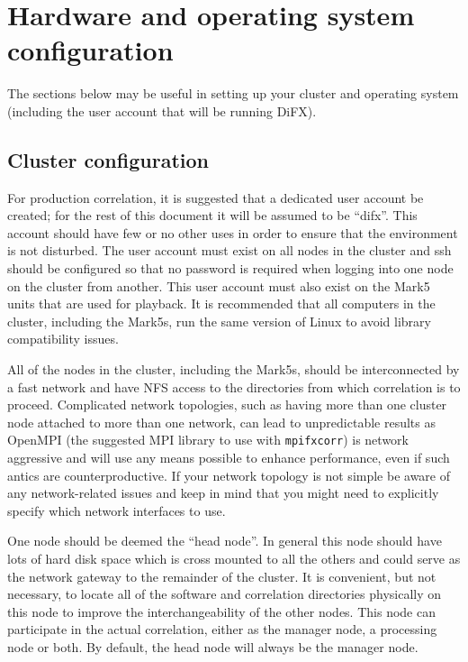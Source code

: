 
\section{Hardware and operating system configuration}

The sections below may be useful in setting up your cluster and operating system (including the user account that will be running DiFX).

\subsection{Cluster configuration} \label{sec:cluster}

For production correlation, it is suggested that a dedicated user account be created; for the rest of this document it will be assumed to be ``difx''.
This account should have few or no other uses in order to ensure that the environment is not disturbed.
The user account must exist on all nodes in the cluster and ssh should be configured so that no password is required when logging into one node on the cluster from another.
This user account must also exist on the Mark5 units that are used for playback.
It is recommended that all computers in the cluster, including the Mark5s, run the same version of Linux to avoid library compatibility issues.

All of the nodes in the cluster, including the Mark5s, should be interconnected by a fast network and have NFS access to the directories from which correlation is to proceed.
Complicated network topologies, such as having more than one cluster node attached to more than one network, can lead to unpredictable results as OpenMPI (the suggested MPI library to use with {\tt mpifxcorr}) is network aggressive and will use any means possible to enhance performance, even if such antics are counterproductive.
If your network topology is not simple be aware of any network-related issues and keep in mind that you might need to explicitly specify which network interfaces to use.

One node should be deemed the ``head node''.
In general this node should have lots of hard disk space which is cross mounted to all the others and could serve as the network gateway to the remainder of the cluster.
It is convenient, but not necessary, to locate all of the software and correlation directories physically on this node to improve the interchangeability of the other nodes.
This node can participate in the actual correlation, either as the manager node, a processing node or both.
By default, the head node will always be the manager node.


